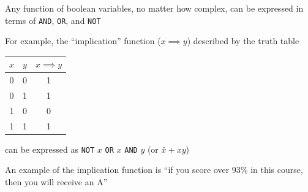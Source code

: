 \documentclass[8pt,a4paper,compress]{beamer}
\begin{document}
\begin{frame}[fragile]
\pause

Any function of boolean variables, no matter how complex, can be expressed in terms of \lstinline{AND}, \lstinline{OR}, and \lstinline{NOT}

\pause
\bigskip

For example, the ``implication'' function ($x \implies y$) described by the truth table
\begin{center}
\begin{tabular}{cc|c}
$x$ & $y$ & $x \implies y$ \\ \hline
0 & 0 & 1 \\
0 & 1 & 1 \\
1 & 0 & 0 \\
1 & 1 & 1
\end{tabular}
\end{center}
can be expressed as \lstinline{NOT} $x$ \lstinline{OR} $x$ \lstinline{AND} $y$ (or $\bar{x}+xy$)

\pause
\bigskip

An example of the implication function is ``if you score over 93\% in this course, then you will receive an A''
\end{frame}
\end{document}
